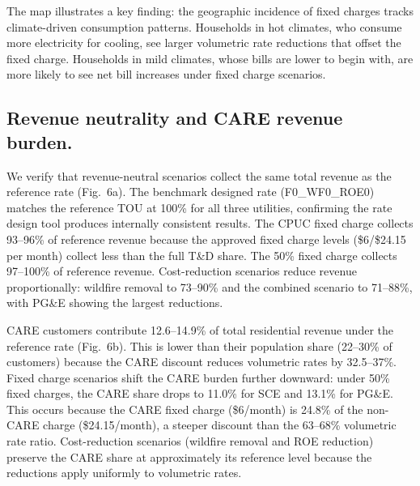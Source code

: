 \documentclass[11pt]{article}
\begin{document}
The map illustrates a key finding: the geographic incidence of fixed charges tracks climate-driven consumption patterns. Households in hot climates, who consume more electricity for cooling, see larger volumetric rate reductions that offset the fixed charge. Households in mild climates, whose bills are lower to begin with, are more likely to see net bill increases under fixed charge scenarios.

\subsection*{Revenue neutrality and CARE revenue burden.}

We verify that revenue-neutral scenarios collect the same total revenue as the reference rate (Fig.~6a). The benchmark designed rate (F0\_WF0\_ROE0) matches the reference TOU at 100\% for all three utilities, confirming the rate design tool produces internally consistent results. The CPUC fixed charge collects 93--96\% of reference revenue because the approved fixed charge levels (\$6/\$24.15 per month) collect less than the full T\&D share. The 50\% fixed charge collects 97--100\% of reference revenue. Cost-reduction scenarios reduce revenue proportionally: wildfire removal to 73--90\% and the combined scenario to 71--88\%, with PG\&E showing the largest reductions.

CARE customers contribute 12.6--14.9\% of total residential revenue under the reference rate (Fig.~6b). This is lower than their population share (22--30\% of customers) because the CARE discount reduces volumetric rates by 32.5--37\%. Fixed charge scenarios shift the CARE burden further downward: under 50\% fixed charges, the CARE share drops to 11.0\% for SCE and 13.1\% for PG\&E. This occurs because the CARE fixed charge (\$6/month) is 24.8\% of the non-CARE charge (\$24.15/month), a steeper discount than the 63--68\% volumetric rate ratio. Cost-reduction scenarios (wildfire removal and ROE reduction) preserve the CARE share at approximately its reference level because the reductions apply uniformly to volumetric rates.
\end{document}

